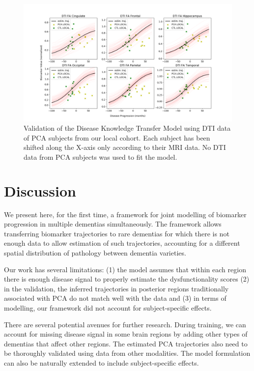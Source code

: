 \documentclass{llncs}
\begin{document}
\begin{figure}
 \includegraphics[width=\textwidth, trim=0 0 0 0, clip]{figures/validDtiPCA.png}
 \caption{Validation of the Disease Knowledge Transfer Model using DTI data of PCA subjects from our local cohort. Each subject has been shifted along the X-axis only according to their MRI data. No DTI data from PCA subjects was used to fit the model.}
\label{fig:DTIvalid}
\end{figure}

\section{Discussion}

We present here, for the first time, a framework for joint modelling of biomarker progression in multiple dementias simultaneously. The framework allows transferring biomarker trajectories to rare dementias for which there is not enough data to allow estimation of such trajectories, accounting for a different spatial distribution of pathology between dementia varieties. 

Our work has several limitations: (1) the model assumes that within each region there is enough disease signal to properly estimate the dysfunctionality scores (2) in the validation, the inferred trajectories in posterior regions traditionally associated with PCA do not match well with the data and (3) in terms of modelling, our framework did not account for subject-specific effects.

There are several potential avenues for further research. During training, we can account for missing disease signal in some brain regions by adding other types of dementias that affect other regions. The estimated PCA trajectories also need to be thoroughly validated using data from other modalities. The model formulation can also be naturally extended to include subject-specific effects.
\end{document}
